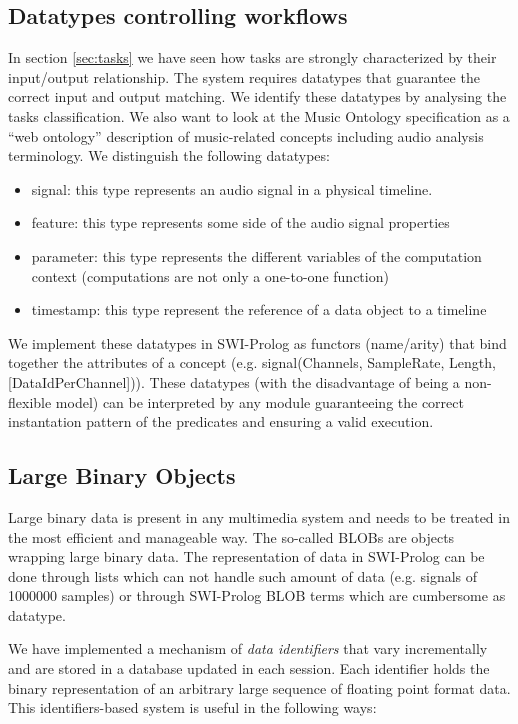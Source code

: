 \documentclass[runningheads]{llncs}
\begin{document}
\subsection{Datatypes controlling workflows}\label{subsec:datatypes}

In section \ref{sec:tasks} we have seen how tasks are strongly characterized by their input/output relationship. The system requires datatypes that guarantee the correct input and output matching. We identify these datatypes by analysing the tasks classification. We also want to look at the Music Ontology specification \cite{mo} as a ``web ontology'' description of music-related concepts including audio analysis terminology. We distinguish the following datatypes:

\begin{itemize}
 \item signal: this type represents an audio signal in a physical timeline. 
 \item feature: this type represents some side of the audio signal properties
 \item parameter: this type represents the different variables of the computation context (computations are not only a one-to-one function)
 \item timestamp: this type represent the reference of a data object to a timeline
\end{itemize}

We implement these datatypes in SWI-Prolog as functors (name/arity) that bind together the attributes of a concept (e.g. signal(Channels, SampleRate, Length, [DataIdPerChannel])). These datatypes (with the disadvantage of being a non-flexible model) can be interpreted by any module guaranteeing the correct instantation pattern of the predicates and ensuring a valid execution.

\subsection{Large Binary Objects}\label{subsec:blobs}

Large binary data is present in any multimedia system and needs to be treated in the most efficient and manageable way. The so-called BLOBs are objects wrapping large binary data. The representation of data in SWI-Prolog can be done through lists which can not handle such amount of data (e.g. signals of 1000000 samples) or through SWI-Prolog BLOB terms which are cumbersome as datatype.

We have implemented a mechanism of \textit{data identifiers} that vary incrementally and are stored in a database updated in each session. Each identifier holds the binary representation of an arbitrary large sequence of floating point format data. This identifiers-based system is useful in the following ways:
\end{document}
